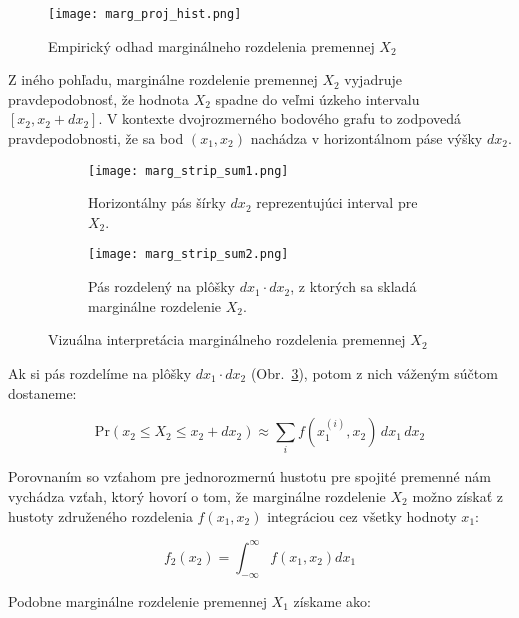 \begin{figure}[H] 
    \centering 
    \texttt{[image: marg\_proj\_hist.png]} 
    \caption{Empirický odhad marginálneho rozdelenia premennej $X_2$} 
    \label{fig:margin_proj} 
\end{figure}

Z iného pohľadu, marginálne rozdelenie premennej $X_2$ vyjadruje pravdepodobnosť, že hodnota $X_2$ spadne do veľmi úzkeho intervalu $[x_2, x_2 + dx_2]$. V kontexte dvojrozmerného bodového grafu to zodpovedá pravdepodobnosti, že sa bod $(x_1, x_2)$ nachádza v horizontálnom páse výšky $dx_2$.

\begin{figure}[H]
    \centering
    \begin{subfigure}[b]{0.48\linewidth}
        \centering
        \texttt{[image: marg\_strip\_sum1.png]}
        \caption{Horizontálny pás šírky $dx_2$ reprezentujúci interval pre $X_2$.}
        \label{fig:marg_strip_a}
    \end{subfigure}
    \hfill
    \begin{subfigure}[b]{0.48\linewidth}
        \centering
        \texttt{[image: marg\_strip\_sum2.png]}
        \caption{Pás rozdelený na plôšky $dx_1 \cdot dx_2$, z ktorých sa skladá marginálne rozdelenie $X_2$.}
        \label{fig:marg_strip_b}
    \end{subfigure}
    \caption{Vizuálna interpretácia marginálneho rozdelenia premennej $X_2$}
    \label{fig:marg_strip}
\end{figure}

Ak si pás rozdelíme na plôšky $dx_1 \cdot dx_2$  (Obr.~\ref{fig:marg_strip_b}), potom z nich váženým súčtom dostaneme:

\begin{equation}
\mathrm{Pr}(x_2 \leq X_2 \leq x_2 + dx_2) \approx \sum_i f(x_1^{(i)}, x_2) \, dx_1 \, dx_2
\end{equation}

Porovnaním so vzťahom pre jednorozmernú hustotu pre spojité premenné nám vychádza vzťah, ktorý hovorí o tom, že marginálne rozdelenie $X_2$ možno získať z hustoty združeného rozdelenia $f(x_1, x_2)$ integráciou cez všetky hodnoty $x_1$:

\begin{equation} f_2(x_2) = \int_{-\infty}^{\infty} f(x_1, x_2) dx_1 \end{equation}

Podobne marginálne rozdelenie premennej $X_1$ získame ako:

